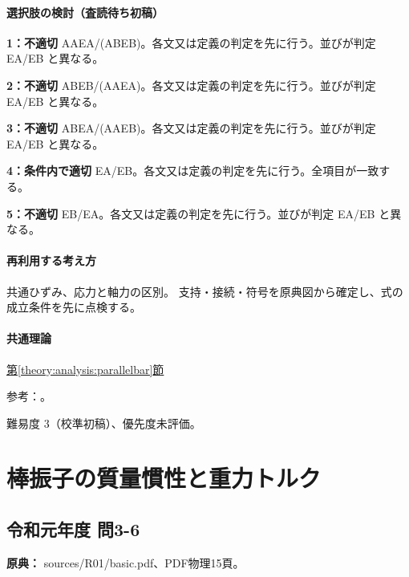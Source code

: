 \paragraph{選択肢の検討（査読待ち初稿）}\mbox{}\par

\noindent\textbf{1：不適切} AAEA/(ABEB)。各文又は定義の判定を先に行う。並びが判定 EA/EB と異なる。\par

\noindent\textbf{2：不適切} ABEB/(AAEA)。各文又は定義の判定を先に行う。並びが判定 EA/EB と異なる。\par

\noindent\textbf{3：不適切} ABEA/(AAEB)。各文又は定義の判定を先に行う。並びが判定 EA/EB と異なる。\par

\noindent\textbf{4：条件内で適切} EA/EB。各文又は定義の判定を先に行う。全項目が一致する。\par

\noindent\textbf{5：不適切} EB/EA。各文又は定義の判定を先に行う。並びが判定 EA/EB と異なる。\par

\paragraph{再利用する考え方} 共通ひずみ、応力と軸力の区別。 支持・接続・符号を原典図から確定し、式の成立条件を先に点検する。

\paragraph{共通理論} \hyperref[theory:analysis:parallelbar]{第\ref*{theory:analysis:parallelbar}節}

\par 参考：\cite{mit_material_elastic2000}。

\par 難易度 3（校準初稿）、優先度未評価。

\section{棒振子の質量慣性と重力トルク}

\subsection{令和元年度 問3-6}
\label{q:r01-reg-basic-3-6}

\noindent\textbf{原典：} sources/R01/basic.pdf、PDF物理15頁。

